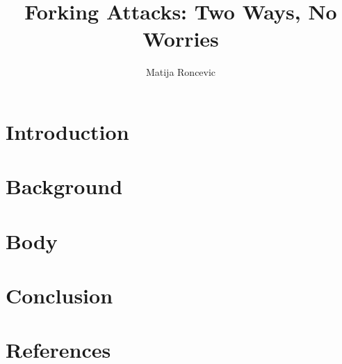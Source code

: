 \documentclass[sigconf]{acmart}
\title{Forking Attacks: Two Ways, No Worries}
\author{Matija Roncevic}
\affiliation{
    \institution{Friedricht-Alexander-Universität Erlangen-Nürnberg}
    \country{}}
\begin{document}
\maketitle  %

\thispagestyle{plain} %
\pagestyle{plain} %



\section{Introduction}


\section{Background}


\section{Body}


\section{Conclusion}


\section{References}

\end{document}
